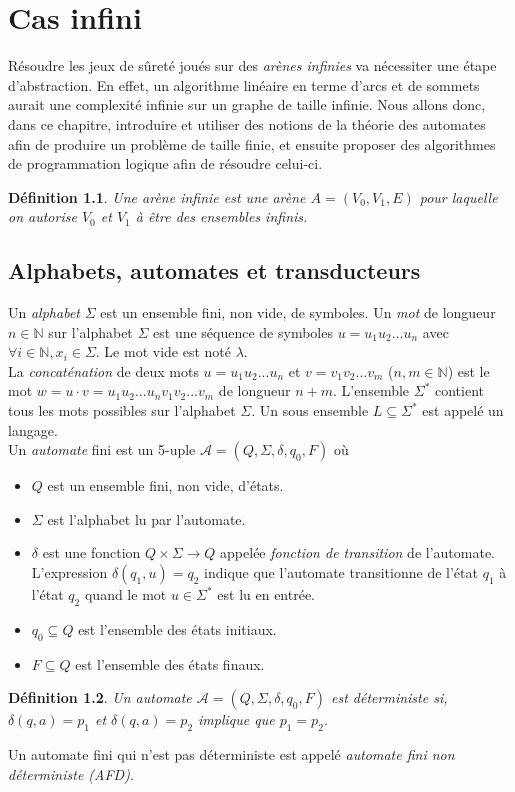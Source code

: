 \documentclass[12pt,a4paper,oneside,titlepage]{report}
\newtheorem{defi}{D\'efinition}[section]
\begin{document}
\chapter{Cas infini}
Résoudre les jeux de sûreté joués sur des \emph{arènes infinies} va nécessiter une étape d'abstraction. En effet, un algorithme linéaire en terme d'arcs et de sommets aurait une complexité infinie sur un graphe de taille infinie. Nous allons donc, dans ce chapitre, introduire et utiliser des notions de la théorie des automates afin de produire un problème de taille finie, et ensuite proposer des algorithmes de programmation logique afin de résoudre celui-ci.
\begin{defi}
Une \emph{arène infinie} est une arène $A=(V_0, V_1, E)$ pour laquelle on autorise $V_0$ et $V_1$ à être des ensembles infinis.
\end{defi}

\section{Alphabets, automates et transducteurs}
Un \emph{alphabet} $\Sigma$ est un ensemble fini, non vide, de symboles. Un \emph{mot} de longueur $n\in\mathbb{N}$ sur l'alphabet $\Sigma$ est une séquence de symboles $u=u_1u_2...u_n$ avec $\forall i\in\mathbb{N}, x_i\in \Sigma$. Le mot vide est noté $\lambda$.\\
La \emph{concaténation} de deux mots $u=u_1u_2...u_n$ et $v=v_1v_2...v_m$ ($n,m\in\mathbb{N}$) est le mot $w=u\cdot v=u_1u_2...u_nv_1v_2...v_m$ de longueur $n+m$. L'ensemble $\Sigma^*$ contient tous les mots possibles sur l'alphabet $\Sigma$. Un sous ensemble $L\subseteq \Sigma^*$ est appelé un langage.\\

\noindent Un \emph{automate} fini est un 5-uple $\mathcal{A}=(Q,\Sigma,\delta,q_0,F)$ où 
\begin{itemize}
	\item $Q$ est un ensemble fini, non vide, d'états.
	\item $\Sigma$ est l'alphabet lu par l'automate.
	\item $\delta$ est une fonction $Q\times\Sigma\to Q$ appelée \emph{fonction de transition} de l'automate. L'expression $\delta(q_1,u)=q_2$ indique que l'automate transitionne de l'état $q_1$ à l'état $q_2$ quand le mot $u\in\Sigma^*$ est lu en entrée.
	\item $q_0\subseteq Q$ est l'ensemble des états initiaux.
	\item $F\subseteq Q$ est l'ensemble des états finaux.
\end{itemize}
\begin{defi}
\label{deter}
Un automate $\mathcal{A}=(Q,\Sigma,\delta,q_0,F)$ est \emph{déterministe} si, $\delta(q,a)=p_1$ et $\delta(q,a)=p_2$ implique que $p_1=p_2$.
\end{defi}
Un automate fini qui n'est pas déterministe est appelé \emph{automate fini non déterministe (AFD)}.\\
\end{document}
